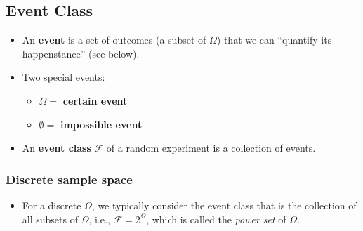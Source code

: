 \subsection{Event Class}
\begin{itemize}
\item An \textbf{event} is a set of outcomes (a subset of \(\Omega\))
   that we can ``quantify its happenstance'' (see below). 
\item Two special events: 
\begin{itemize}
\item \(\Omega =\)  \textbf{certain event} 
\item \(\emptyset =\) \textbf{impossible event}
\end{itemize}
\item An \textbf{event class} \(\mathcal{F}\) of a random experiment
is a collection of events.
\end{itemize}

\subsubsection{Discrete sample space}
\begin{itemize}
\item For a discrete \(\Omega\), we typically consider the event class
that is the collection of all subsets of \(\Omega\), i.e., \(\mathcal{F} = 2^{\Omega}\),
which is called the \emph{power set} of \(\Omega\).
\end{itemize}

